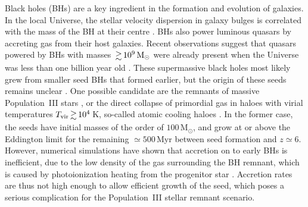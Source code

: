 \documentclass[useAMS,usenatbib]{mnras}
\newcommand{\msun}{\text{M}_\odot}
\begin{document}
Black holes (BHs) are a key ingredient in the formation and evolution of galaxies. In the local Universe, the stellar velocity dispersion in galaxy bulges is correlated with the mass of the BH at their centre \citep{Ferrarese_00,Gebhardt_00}. BHs also power luminous quasars by accreting gas from their host galaxies. Recent observations suggest that quasars powered by BHs with masses $\ga 10^9\,\msun$ were already present when the Universe was less than one billion year old \citep{Fan_2003, Fan_2006}. These supermassive black holes most likely grew from smaller seed BHs that formed earlier, but the origin of these seeds remains unclear \citep{Haiman_2006, Haiman_2009, Greene_2012, Volonteri_2012, Volonteri_Bellovary_2012}. One possible candidate are the remnants of massive Population~III stars \citep{Madau_2001, Li_2007, Johnson_2012}, or the direct collapse of primordial gas in haloes with virial temperatures $T_{\rm vir}\ga 10^4\,$K, so-called atomic cooling haloes \citep{Bromm_2003, Bromm_Yoshida_2011}. In the former case, the seeds have initial masses of the order of $100\,\msun$, and grow at or above the Eddington limit for the remaining $\simeq 500\,$Myr between seed formation and $z\simeq 6$. However, numerical simulations have shown that accretion on to early BHs is inefficient, due to the low density of the gas surrounding the BH remnant, which is caused by photoionization heating from the progenitor star \citep{Johnson_2007, Alvarez_2009}. Accretion rates are thus not high enough to allow efficient growth of the seed, which poses a serious complication for the Population~III stellar remnant scenario.
\end{document}
